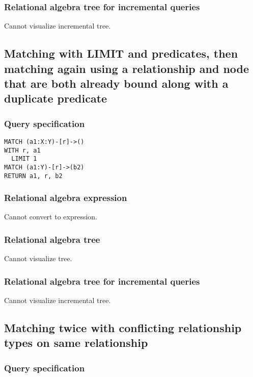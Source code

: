 \subsubsection*{Relational algebra tree for incremental queries}

Cannot visualize incremental tree.

\subsection{Matching with LIMIT and predicates, then matching again using a relationship and node that are both already bound along with a duplicate predicate}

\subsubsection*{Query specification}

\begin{lstlisting}
MATCH (a1:X:Y)-[r]->()
WITH r, a1
  LIMIT 1
MATCH (a1:Y)-[r]->(b2)
RETURN a1, r, b2
\end{lstlisting}

\subsubsection*{Relational algebra expression}

Cannot convert to expression.

\subsubsection*{Relational algebra tree}

Cannot visualize tree.

\subsubsection*{Relational algebra tree for incremental queries}

Cannot visualize incremental tree.

\subsection{Matching twice with conflicting relationship types on same relationship}

\subsubsection*{Query specification}

